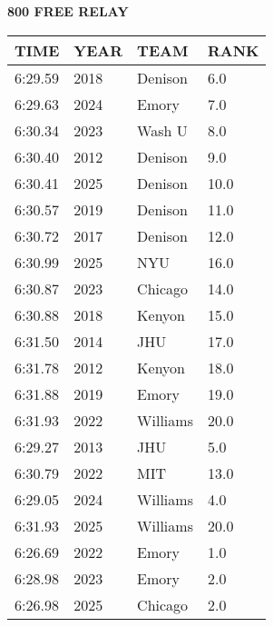 \begin{center}
\begin{minipage}[t]{0.7\textwidth}
\centering
\textbf{800 FREE RELAY}\\[0.05cm]
\begin{tabular}{@{}p{1.8cm}p{1.2cm}p{1.4cm}p{0.8cm}@{}}
\hline
\textbf{TIME} & \textbf{YEAR} & \textbf{TEAM} & \textbf{RANK} \\
\hline
6:29.59 & 2018 & Denison & 6.0 \\
6:29.63 & 2024 & Emory & 7.0 \\
6:30.34 & 2023 & Wash U & 8.0 \\
6:30.40 & 2012 & Denison & 9.0 \\
6:30.41 & 2025 & Denison & 10.0 \\
6:30.57 & 2019 & Denison & 11.0 \\
6:30.72 & 2017 & Denison & 12.0 \\
6:30.99 & 2025 & NYU & 16.0 \\
6:30.87 & 2023 & Chicago & 14.0 \\
6:30.88 & 2018 & Kenyon & 15.0 \\
6:31.50 & 2014 & JHU & 17.0 \\
6:31.78 & 2012 & Kenyon & 18.0 \\
6:31.88 & 2019 & Emory & 19.0 \\
6:31.93 & 2022 & Williams & 20.0 \\
6:29.27 & 2013 & JHU & 5.0 \\
6:30.79 & 2022 & MIT & 13.0 \\
6:29.05 & 2024 & Williams & 4.0 \\
6:31.93 & 2025 & Williams & 20.0 \\
6:26.69 & 2022 & Emory & 1.0 \\
6:28.98 & 2023 & Emory & 2.0 \\
6:26.98 & 2025 & Chicago & 2.0 \\
\hline
\end{tabular}
\end{minipage}
\end{center}

\vspace{0.4cm}

